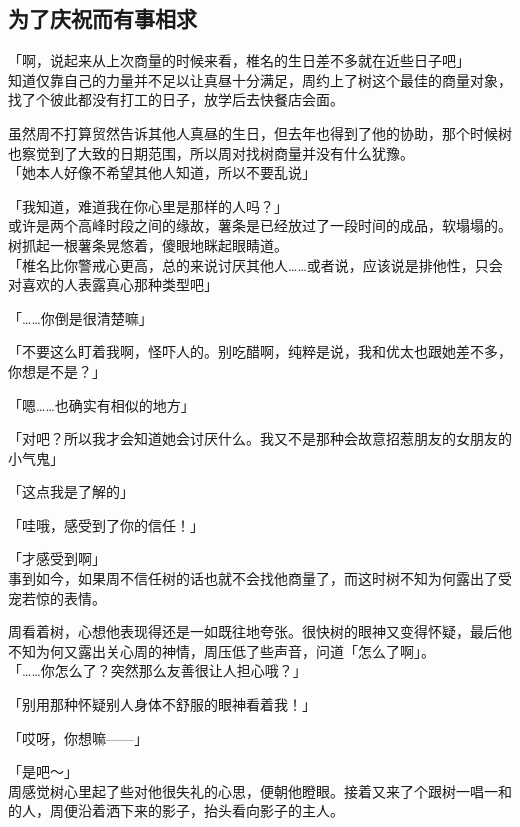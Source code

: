 \subsection{为了庆祝而有事相求}

「啊，说起来从上次商量的时候来看，椎名的生日差不多就在近些日子吧」\\

知道仅靠自己的力量并不足以让真昼十分满足，周约上了树这个最佳的商量对象，找了个彼此都没有打工的日子，放学后去快餐店会面。

虽然周不打算贸然告诉其他人真昼的生日，但去年也得到了他的协助，那个时候树也察觉到了大致的日期范围，所以周对找树商量并没有什么犹豫。\\

「她本人好像不希望其他人知道，所以不要乱说」

「我知道，难道我在你心里是那样的人吗？」\\

或许是两个高峰时段之间的缘故，薯条是已经放过了一段时间的成品，软塌塌的。树抓起一根薯条晃悠着，傻眼地眯起眼睛道。\\

「椎名比你警戒心更高，总的来说讨厌其他人……或者说，应该说是排他性，只会对喜欢的人表露真心那种类型吧」

「……你倒是很清楚嘛」

「不要这么盯着我啊，怪吓人的。别吃醋啊，纯粹是说，我和优太也跟她差不多，你想是不是？」

「嗯……也确实有相似的地方」

「对吧？所以我才会知道她会讨厌什么。我又不是那种会故意招惹朋友的女朋友的小气鬼」

「这点我是了解的」

「哇哦，感受到了你的信任！」

「才感受到啊」\\

事到如今，如果周不信任树的话也就不会找他商量了，而这时树不知为何露出了受宠若惊的表情。

周看着树，心想他表现得还是一如既往地夸张。很快树的眼神又变得怀疑，最后他不知为何又露出关心周的神情，周压低了些声音，问道「怎么了啊」。\\

「……你怎么了？突然那么友善很让人担心哦？」

「别用那种怀疑别人身体不舒服的眼神看着我！」

「哎呀，你想嘛——」

「是吧～」\\

周感觉树心里起了些对他很失礼的心思，便朝他瞪眼。接着又来了个跟树一唱一和的人，周便沿着洒下来的影子，抬头看向影子的主人。

